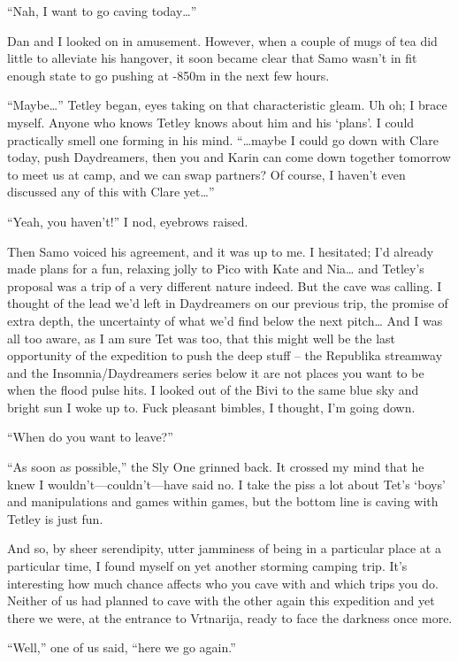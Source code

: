 ``Nah, I want to go caving today\ldots{}''

Dan and I looked on in amusement. However, when a couple of mugs of tea
did little to alleviate his hangover, it soon became clear that Samo
wasn't in fit enough state to go pushing at -850m in the next few hours.

``Maybe\ldots{}'' Tetley began, eyes taking on that characteristic
gleam. Uh oh; I brace myself. Anyone who knows Tetley knows about him
and his `plans'. I could practically smell one forming in his mind.
``\ldots{}maybe I could go down with Clare today, push Daydreamers, then
you and Karin can come down together tomorrow to meet us at camp, and we
can swap partners? Of course, I haven't even discussed any of this with
Clare yet\ldots{}''

``Yeah, you haven't!'' I nod, eyebrows raised.

Then Samo voiced his agreement, and it was up to me. I hesitated; I'd
already made plans for a fun, relaxing jolly to Pico with Kate and
Nia\ldots{} and Tetley's proposal was a trip of a very different nature
indeed. But the cave was calling. I thought of the lead we'd left in
Daydreamers on our previous trip, the promise of extra depth, the
uncertainty of what we'd find below the next pitch\ldots{} And I was all
too aware, as I am sure Tet was too, that this might well be the last
opportunity of the expedition to push the deep stuff -- the Republika
streamway and the Insomnia/Daydreamers series below it are not places
you want to be when the flood pulse hits. I looked out of the Bivi to
the same blue sky and bright sun I woke up to. Fuck pleasant bimbles, I
thought, I'm going down.

``When do you want to leave?''

``As soon as possible,'' the Sly One grinned back. It crossed my mind
that he knew I wouldn't---couldn't---have said no. I take the piss a lot
about Tet's `boys' and manipulations and games within games, but the
bottom line is caving with Tetley is just fun.

And so, by sheer serendipity, utter jamminess of being in a particular
place at a particular time, I found myself on yet another storming
camping trip. It's interesting how much chance affects who you cave with
and which trips you do. Neither of us had planned to cave with the other
again this expedition and yet there we were, at the entrance to
Vrtnarija, ready to face the darkness once more.

``Well,'' one of us said, ``here we go again.''


